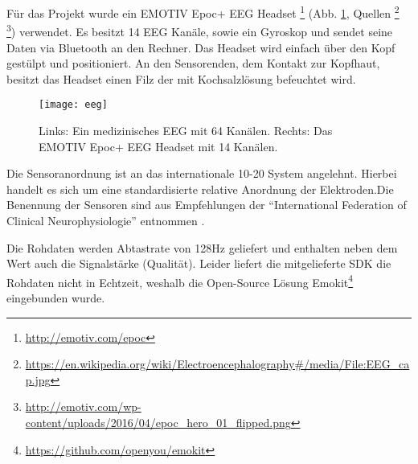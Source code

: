 \label{chap:eeg}
Für das Projekt wurde ein EMOTIV Epoc+ EEG Headset \footnote{\url{http://emotiv.com/epoc}} (Abb. \ref{fig:eeg}, Quellen \footnote{\url{https://en.wikipedia.org/wiki/Electroencephalography\#/media/File:EEG_cap.jpg}} \footnote{\url{http://emotiv.com/wp-content/uploads/2016/04/epoc_hero_01_flipped.png}}) verwendet. Es besitzt 14 EEG Kanäle, sowie ein Gyroskop und sendet seine Daten via Bluetooth an den Rechner. Das Headset wird einfach über den Kopf gestülpt und positioniert. An den Sensorenden, dem Kontakt zur Kopfhaut, besitzt das Headset einen Filz der mit Kochsalzlösung befeuchtet wird.

\begin{figure}[h] 
  \begin{center}
    \texttt{[image: eeg]}
    \caption[Medzinisches EEG / EMOTIV Epoc+]{Links: Ein medizinisches EEG mit 64 Kanälen. Rechts: Das EMOTIV Epoc+ EEG Headset mit 14 Kanälen.\label{fig:eeg}}
  \end{center}
\end{figure}

Die Sensoranordnung ist an das internationale 10-20 System \cite{10-20}  angelehnt. Hierbei handelt es sich um eine standardisierte relative Anordnung der Elektroden.Die Benennung der Sensoren  sind aus Empfehlungen der "`International Federation of Clinical Neurophysiologie"' entnommen \cite{ifcn}. 

\epocSensors

Die Rohdaten werden Abtastrate von 128Hz geliefert und enthalten neben dem Wert auch die Signalstärke (Qualität). Leider liefert die mitgelieferte SDK die Rohdaten nicht in Echtzeit, weshalb die Open-Source Lösung Emokit\footnote{\url{https://github.com/openyou/emokit}} eingebunden wurde.
